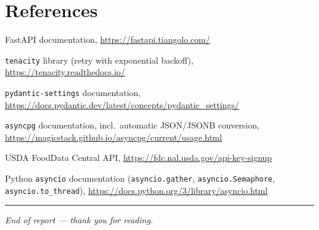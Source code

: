 \documentclass[11pt,a4paper]{article}
\begin{document}
\section*{References}

\begin{enumerate}[label={[\arabic*]},leftmargin=2.4em,itemsep=2pt]
  \item FastAPI documentation, \url{https://fastapi.tiangolo.com/}
  \item \texttt{tenacity} library (retry with exponential backoff), \url{https://tenacity.readthedocs.io/}
  \item \texttt{pydantic-settings} documentation, \url{https://docs.pydantic.dev/latest/concepts/pydantic_settings/}
  \item \texttt{asyncpg} documentation, incl.\ automatic JSON/JSONB conversion, \url{https://magicstack.github.io/asyncpg/current/usage.html}
  \item USDA FoodData Central API, \url{https://fdc.nal.usda.gov/api-key-signup}
  \item Python \texttt{asyncio} documentation (\texttt{asyncio.gather}, \texttt{asyncio.Semaphore}, \texttt{asyncio.to\_thread}), \url{https://docs.python.org/3/library/asyncio.html}
\end{enumerate}

\appendix
\vspace{1em}\hrule\vspace{0.6em}
\noindent\small\textit{End of report --- thank you for reading.}
\end{document}
